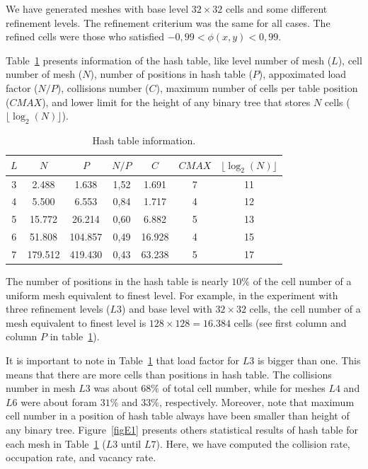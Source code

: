 \documentclass[review]{elsarticle}
\begin{document}
We have generated meshes with base level $32\times 32$ cells and some different refinement levels. The refinement criterium was the same for all cases. The refined cells were those who satisfied $-0,99 < \phi(x,y) < 0,99$.

Table~\ref{tab1} presents information of the hash table, like level number of mesh ($L$), cell number of mesh ($N$), number of positions in hash table ($P$), appoximated load factor ($N/P$), collisions number ($C$), maximum number of cells per table position ($CMAX$), and lower limit for the height of any binary tree that stores $N$ cells ($\lfloor\log_2(N)\rfloor$).%

\begin{table}[ht]\label{tab1}
\caption{ {\small Hash table information.}}
\centering
\begin{tabular}{ccccccc}
  \hline
$L$  & $N$  & $P$ & $N/P$ & $C$ & $CMAX$ & $\lfloor\log_2(N)\rfloor$ \\%
\hline
3  &2.488 & 1.638  & 1,52 & 1.691 &  7 & 11 \\%
4  &5.500 & 6.553  & 0,84   & 1.717 & 4 & 12  \\%
5  &15.772 & 26.214 & 0,60 & 6.882 & 5 & 13 \\ %
6  &51.808 & 104.857 & 0,49  & 16.928 & 4 & 15 \\%
7  &179.512 & 419.430 & 0,43  & 63.238 & 5 & 17 \\%
\hline
\end{tabular}\label{tab1}
\end{table}

The number of positions in the hash table is nearly $10\%$ of the cell number of a uniform mesh equivalent to finest level. For example, in the experiment with three refinement levels ($L3$) and base level with $32 \times 32$ cells, the cell number of a mesh equivalent to finest level is $128 \times 128 = 16.384$ cells (see first column and column $P$ in table~\ref{tab1}). %

It is important to note in Table~\ref{tab1} that load factor for $L3$ is bigger than one. This means that there are more cells than positions in hash table. The collisions number in mesh $L3$ was about $68\%$ of total cell number, while for meshes $L4$ and $L6$ were about foram $31\%$ and $33\%$, respectively. Moreover, note that maximum cell number in a position of hash table always have been smaller than height of any binary tree. Figure~\ref{figE1} presents others statistical results of hash table for each mesh in Table~\ref{tab1} ($L3$ until $L7$). Here, we have computed the collision rate, occupation rate, and vacancy rate.
\end{document}
